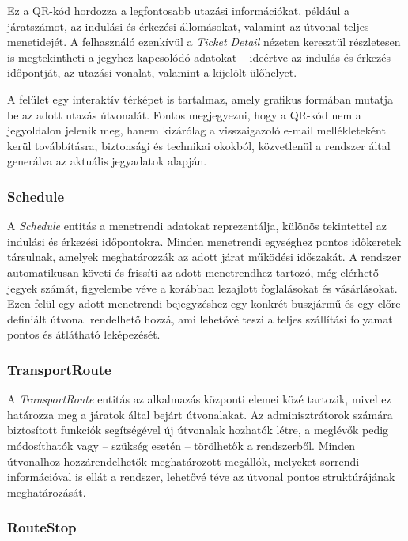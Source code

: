Ez a QR-kód hordozza a legfontosabb utazási információkat, például a járatszámot, az indulási és érkezési állomásokat, valamint az útvonal teljes menetidejét. A felhasználó ezenkívül a \textit{Ticket Detail} nézeten keresztül részletesen is megtekintheti a jegyhez kapcsolódó adatokat – ideértve az indulás és érkezés időpontját, az utazási vonalat, valamint a kijelölt ülőhelyet.

A felület egy interaktív térképet is tartalmaz, amely grafikus formában mutatja be az adott utazás útvonalát. Fontos megjegyezni, hogy a QR-kód nem a jegyoldalon jelenik meg, hanem kizárólag a visszaigazoló e-mail mellékleteként kerül továbbításra, biztonsági és technikai okokból, közvetlenül a rendszer által generálva az aktuális jegyadatok alapján.

\subsubsection{Schedule}

A \textit{Schedule} entitás a menetrendi adatokat reprezentálja, különös tekintettel az indulási és érkezési időpontokra. Minden menetrendi egységhez pontos időkeretek társulnak, amelyek meghatározzák az adott járat működési időszakát. A rendszer automatikusan követi és frissíti az adott menetrendhez tartozó, még elérhető jegyek számát, figyelembe véve a korábban lezajlott foglalásokat és vásárlásokat. Ezen felül egy adott menetrendi bejegyzéshez egy konkrét buszjármű és egy előre definiált útvonal rendelhető hozzá, ami lehetővé teszi a teljes szállítási folyamat pontos és átlátható leképezését.

\subsubsection{TransportRoute}

A \textit{TransportRoute} entitás az alkalmazás központi elemei közé tartozik, mivel ez határozza meg a járatok által bejárt útvonalakat. Az adminisztrátorok számára biztosított funkciók segítségével új útvonalak hozhatók létre, a meglévők pedig módosíthatók vagy – szükség esetén – törölhetők a rendszerből. Minden útvonalhoz hozzárendelhetők meghatározott megállók, melyeket sorrendi információval is ellát a rendszer, lehetővé téve az útvonal pontos struktúrájának meghatározását.

\subsubsection{RouteStop}

